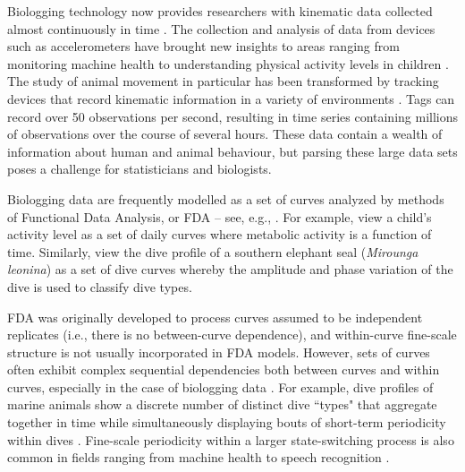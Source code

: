 
Biologging technology now provides researchers with kinematic data collected almost continuously in time \citep{Hooten:2017}.
The collection and analysis of data from devices such as accelerometers have brought new insights to areas ranging from monitoring machine health \citep{Getman:2009} to understanding physical activity levels in children \citep{Morris:2007}. The study of animal movement in particular has been transformed by tracking devices that record kinematic information in a variety of environments \citep{Borger:2020,Dot:2016b}. Tags can record over 50 observations per second, resulting in time series containing millions of observations over the course of several hours. These data contain a wealth of information about human and animal behaviour, but parsing these large data sets poses a challenge for statisticians and biologists.

Biologging data are frequently modelled as a set of curves analyzed by methods of Functional Data Analysis, or FDA -- see, e.g., \citet{Ramsay:2005}. For example, \citet{Morris:2007} view a child's activity level as a set of daily curves where metabolic activity is a function of time. Similarly, \citet{Fu:2017} view the dive profile of a southern elephant seal (\textit{Mirounga leonina}) as a set of dive curves whereby the amplitude and phase variation of the dive is used to classify dive types.

FDA was originally developed to process curves assumed to be independent replicates (i.e., there is no between-curve dependence), and within-curve fine-scale structure is not usually incorporated in FDA models. However, sets of curves often exhibit complex sequential dependencies both between curves and within curves, especially in the case of biologging data \citep{Barajas:2017}.
For example, dive profiles of marine animals show a discrete number of distinct dive ``types" that aggregate together in time \citep{Tennessen:2019b} while simultaneously displaying bouts of short-term periodicity within dives \citep{Adam:2019}. Fine-scale periodicity within a larger state-switching process is also common in fields ranging from machine health \citep{Xin:2018,Lucero:2019} to speech recognition \citep{Juang:1991}. 

